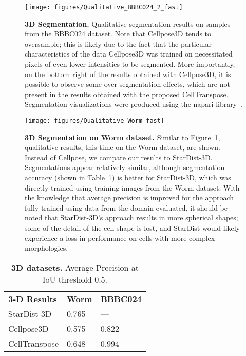 \begin{figure}
\centering
\texttt{[image: figures/Qualitative\_BBBC024\_2\_fast]}
\caption{\textbf{3D Segmentation.} Qualitative segmentation results on samples from the BBBC024 dataset. Note that Cellpose3D tends to oversample; this is likely due to the fact that the particular characteristics of the data Cellpose3D was trained on necessitated pixels of even lower intensities to be segmented. More importantly, on the bottom right of the results obtained with Cellpose3D, it is possible to observe some over-segmentation effects, which are not present in the results obtained with the proposed CellTranspose. Segmentation visualizations were produced using the napari library~\cite{Sofroniew2022-kk}.}
\label{fig:BBBC024_segmentation}
\end{figure}

\begin{figure}
\centering
\texttt{[image: figures/Qualitative\_Worm\_fast]}
\caption{\textbf{3D Segmentation on Worm dataset.} Similar to Figure~\ref{fig:BBBC024_segmentation}, qualitative results, this time on the Worm dataset, are shown. Instead of Cellpose, we compare our results to StarDist-3D. Segmentations appear relatively similar, although segmentation accuracy (shown in Table~\ref{table:3D_results}) is better for StarDist-3D, which was directly trained using training images from the Worm dataset. With the knowledge that average precision is improved for the approach fully trained using data from the domain evaluated, it should be noted that StarDist-3D's approach results in more spherical shapes; some of the detail of the cell shape is lost, and StarDist would likely experience a loss in performance on cells with more complex morphologies.}
\label{fig:Worm_segmentation}
\end{figure}

\begin{table}
\begin{center}
\caption{\textbf{3D datasets.} Average Precision at IoU threshold 0.5.}
\label{table:3D_results}
\begin{tabular}{l|l|l}
\hline\noalign{\smallskip}
{\bf 3-D Results} & {\bf Worm} & {\bf BBBC024}\\
\noalign{\smallskip}
\hline
\noalign{\smallskip}
StarDist-3D				& 0.765 	& --- \\
Cellpose3D			    & 0.575 	& 0.822 \\
CellTranspose  			& 0.648 	& 0.994 \\
\hline
\end{tabular}
\end{center}
\vspace{-5mm}
\end{table}





